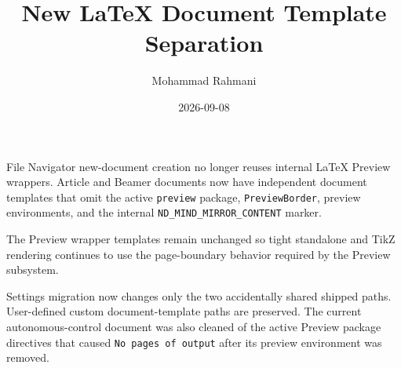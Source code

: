 \documentclass[a4paper]{article}
\title{New LaTeX Document Template Separation}
\date{2026-09-08}
\author{Mohammad Rahmani}
\begin{document}
   \maketitle

   \begin{preview}
      File Navigator new-document creation no longer reuses internal LaTeX Preview wrappers. Article and Beamer documents now have independent document templates that omit the active \texttt{preview} package, \texttt{PreviewBorder}, preview environments, and the internal \texttt{ND\_MIND\_MIRROR\_CONTENT} marker.

      The Preview wrapper templates remain unchanged so tight standalone and TikZ rendering continues to use the page-boundary behavior required by the Preview subsystem.

      Settings migration now changes only the two accidentally shared shipped paths. User-defined custom document-template paths are preserved. The current autonomous-control document was also cleaned of the active Preview package directives that caused \texttt{No pages of output} after its preview environment was removed.
   \end{preview}

   
   
\end{document}
